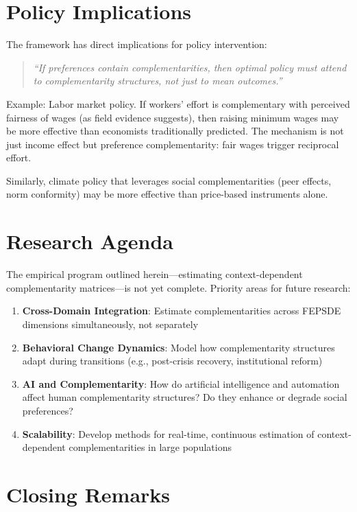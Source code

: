 \documentclass[12pt,oneside]{book}
\begin{document}
\section{Policy Implications}

The framework has direct implications for policy intervention:

\begin{quote}
\textit{``If preferences contain complementarities, then optimal policy must attend to
complementarity structures, not just to mean outcomes.''}
\end{quote}

Example: Labor market policy. If workers' effort is complementary with perceived fairness of wages
(as field evidence suggests), then raising minimum wages may be more effective than economists
traditionally predicted. The mechanism is not just income effect but preference complementarity:
fair wages trigger reciprocal effort.

Similarly, climate policy that leverages social complementarities (peer effects, norm conformity)
may be more effective than price-based instruments alone.

\section{Research Agenda}

The empirical program outlined herein—estimating context-dependent complementarity matrices—is
not yet complete. Priority areas for future research:

\begin{enumerate}
  \item \textbf{Cross-Domain Integration}: Estimate complementarities across FEPSDE dimensions
        simultaneously, not separately
  \item \textbf{Behavioral Change Dynamics}: Model how complementarity structures adapt during
        transitions (e.g., post-crisis recovery, institutional reform)
  \item \textbf{AI and Complementarity}: How do artificial intelligence and automation affect
        human complementarity structures? Do they enhance or degrade social preferences?
  \item \textbf{Scalability}: Develop methods for real-time, continuous estimation of context-dependent
        complementarities in large populations
\end{enumerate}

\section{Closing Remarks}
\end{document}
